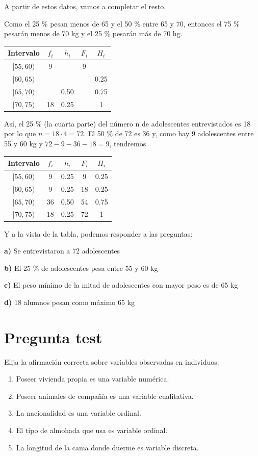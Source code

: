 \documentclass[
]{book}
\providecommand{\tightlist}{%
  \setlength{\itemsep}{0pt}\setlength{\parskip}{0pt}}
\begin{document}
A partir de estos datos, vamos a completar el resto.

Como el 25 \% pesan menos de 65 y el 50 \% entre 65 y 70, entonces el 75 \% pesarán menos de 70 kg y el 25 \% pesarán más de 70 hg.

\begin{longtable}[]{@{}ccccc@{}}
\toprule
Intervalo & \(f_i\) & \(h_i\) & \(F_i\) & \(H_i\)\tabularnewline
\midrule
\endhead
\([55,60)\) & 9 & & 9 &\tabularnewline
\([60,65)\) & & & & 0.25\tabularnewline
\([65,70)\) & & 0.50 & & 0.75\tabularnewline
\([70,75)\) & 18 & 0.25 & & 1\tabularnewline
\bottomrule
\end{longtable}

Así, el 25 \% (la cuarta parte) del número n de adolescentes entrevistados es 18 por lo que \(n = 18 \cdot 4 = 72\). El 50 \% de 72 es 36 y, como hay 9 adolescentes entre 55 y 60 kg y \(72 - 9 - 36 - 18 = 9\), tendremos

\begin{longtable}[]{@{}ccccc@{}}
\toprule
Intervalo & \(f_i\) & \(h_i\) & \(F_i\) & \(H_i\)\tabularnewline
\midrule
\endhead
\([55,60)\) & 9 & 0.25 & 9 & 0.25\tabularnewline
\([60,65)\) & 9 & 0.25 & 18 & 0.25\tabularnewline
\([65,70)\) & 36 & 0.50 & 54 & 0.75\tabularnewline
\([70,75)\) & 18 & 0.25 & 72 & 1\tabularnewline
\bottomrule
\end{longtable}

Y a la vista de la tabla, podemos responder a las preguntas:

\textbf{a)} Se entrevistaron a 72 adolescentes

\textbf{b)} El 25 \% de adolescentes pesa entre 55 y 60 kg

\textbf{c)} El peso mínimo de la mitad de adolescentes con mayor peso es de 65 kg

\textbf{d)} 18 alumnos pesan como máximo 65 kg

\hypertarget{pregunta-test-4}{%
\section{Pregunta test}\label{pregunta-test-4}}

Elija la afirmación correcta sobre variables observadas en individuos:

\begin{enumerate}
\def\labelenumi{\alph{enumi})}
\tightlist
\item
  Poseer vivienda propia es una variable numérica.
\item
  Poseer animales de compañía es una variable cualitativa.
\item
  La nacionalidad es una variable ordinal.
\item
  El tipo de almohada que usa es variable ordinal.
\item
  La longitud de la cama donde duerme es variable discreta.
\end{enumerate}
\end{document}

